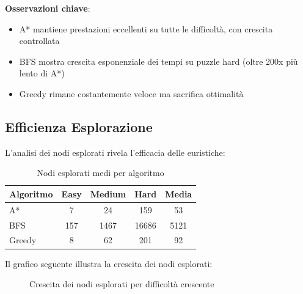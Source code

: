 \documentclass[12pt,a4paper]{report}
\theoremstyle{definition}
\begin{document}
\textbf{Osservazioni chiave}:

\begin{itemize}
    \item A* mantiene prestazioni eccellenti su tutte le difficoltà, con crescita controllata
    \item BFS mostra crescita esponenziale dei tempi su puzzle hard (oltre 200x più lento di A*)
    \item Greedy rimane costantemente veloce ma sacrifica ottimalità
\end{itemize}

\subsection{Efficienza Esplorazione}

L'analisi dei nodi esplorati rivela l'efficacia delle euristiche:

\begin{table}[H]
\centering
\caption{Nodi esplorati medi per algoritmo}
\begin{tabular}{|l|c|c|c|c|}
\hline
\textbf{Algoritmo} & \textbf{Easy} & \textbf{Medium} & \textbf{Hard} & \textbf{Media} \\
\hline
A* & 7 & 24 & 159 & 53 \\
BFS & 157 & 1467 & 16686 & 5121 \\
Greedy & 8 & 62 & 201 & 92 \\
\hline
\end{tabular}
\end{table}

Il grafico seguente illustra la crescita dei nodi esplorati:

\begin{figure}[H]
\centering
{}
\caption{Crescita dei nodi esplorati per difficoltà crescente}
\end{figure}
\end{document}
